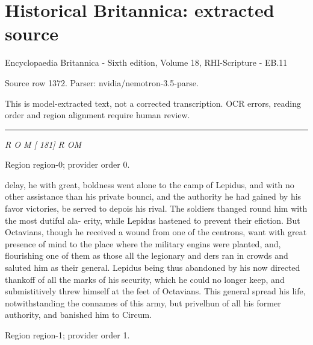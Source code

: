 \documentclass[11pt]{article}
\begin{document}
\section*{Historical Britannica: extracted source}
Encyclopaedia Britannica - Sixth edition, Volume 18, RHI-Scripture - EB.11\par
{\small Source row 1372. Parser: nvidia/nemotron-3.5-parse.\par}
{\small This is model-extracted text, not a corrected transcription. OCR errors, reading order and region alignment require human review.\par}
\hrule\medskip
{\small\itshape R O M [ 181] R OM\par}

{\scriptsize\color{gray} Region region-0; provider order 0.\par}
\medskip

delay, he with great, boldness went alone to the camp of Lepidus, and with no other assistance than his private bounci, and the authority he had gained by his favor victories, be served to depois his rival. The soldiers thanged round him with the most dutiful ala- erity, while Lepidus hastened to prevent their efiction. But Octavians, though he received a wound from one of the centrons, want with great presence of mind to the place where the military engins were planted, and, flourishing one of them as those all the legionary and ders ran in crowds and saluted him as their general. Lepidus being thus abandoned by his now directed thankoff of all the marks of his security, which he could no longer keep, and submistitively threw himself at the feet of Octavians. This general spread his life, notwithstanding the connames of this army, but privelhun of all his former authority, and banished him to Circum.
\par

{\scriptsize\color{gray} Region region-1; provider order 1.\par}
\medskip
\end{document}

